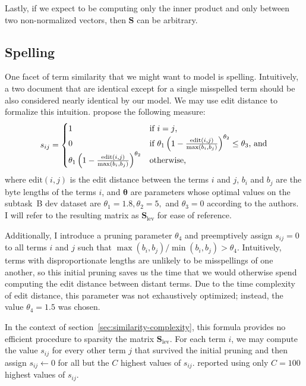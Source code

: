 \documentclass[
  digital, %
  notable, %
  lof,     %
  lot,     %
  nopalatino, color
]{fithesis3}
\begin{document}
Lastly, if we expect to be computing only the inner product and only between
two non-normalized vectors, then $\mathbf S$ can be arbitrary.

\subsection{Spelling}
One facet of term similarity that we might want to model is spelling.
Intuitively, a two document that are identical except for a single misspelled
term should be also considered nearly identical by our model. We may use
edit distance to formalize this intuition.
\textcite{charletdamnati17} propose the following measure:\begin{equation}
  s_{ij} = \begin{cases}
    1 & \text{if }i = j\textrm{,} \\
    0 & \text{if }\theta_1\left(1-\frac{\textrm{edit}(i, j)}{\max(b_i, b_j)}\right)^{\theta_2}\leq\theta_3\textrm{, and} \\
    \theta_1\left(1-\frac{\textrm{edit}(i, j)}{\max(b_i, b_j)}\right)^{\theta_2} & \index{.h1@$\theta_1$|emph}\index{.h2@$\theta_2$|emph}\index{.h3@$\theta _3$|emph}\textrm{otherwise,}
  \end{cases}
\end{equation}
where $\textrm{edit}(i, j)$ is the edit distance between the terms
$i$ and $j$, $b_i$ and $b_j$ are the byte lengths of the terms $i$,
and $\bm\theta$ are parameters whose optimal values on the
subtask~B dev dataset are $\theta_1=1.8,\theta_2=5,$ and $\theta_3=0$ according
to the authors. I will refer to the resulting matrix as $\mathbf
S_{\textrm{lev}}$ for ease of
reference.

Additionally, I introduce a pruning parameter
$\theta_4$ and preemptively assign $s_{ij}=0$ to all
terms $i$ and $j$ such that $\max(b_i, b_j) / \min(b_i, b_j) > \theta_4$.
Intuitively, terms with disproportionate lengths are unlikely to be
misspellings of one another, so this initial pruning saves us the time that we
would otherwise spend computing the edit distance between distant terms.  Due
to the time complexity of edit distance, this parameter was not exhaustively
optimized; instead, the value $\theta_4=1.5$ was chosen.

In the context of section~\ref{sec:similarity-complexity}, this formula
provides no efficient procedure to sparsity the matrix $\mathbf
S_{\textrm{lev}}$. For each term $i$,
we may compute the value $s_{ij}$ for every other term $j$ that survived the
initial pruning and then assign $s_{ij}\leftarrow 0$ for all but the
$C$ highest values of $s_{ij}$. \textcite{charletdamnati17}
reported using only $C=100$ highest values of $s_{ij}$.
\end{document}
